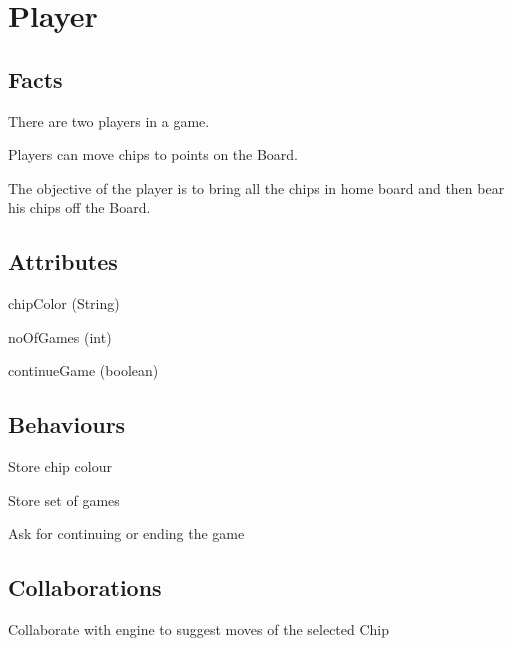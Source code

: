 \section{Player}

\subsection{Facts}

\begin{dashed}
    \item There are two players in a game.
    \item Players can move chips to points on the Board.
    \item The objective of the player is to bring all the chips in home board and then bear his chips off the Board.
\end{dashed}

\subsection{Attributes}

\begin{dashed}
    \item chipColor (String)
    \item noOfGames (int)
    \item continueGame (boolean)
\end{dashed}

\subsection{Behaviours}

\begin{dashed}
    \item Store chip colour
    \item Store set of games
    \item Ask for continuing or ending the game
\end{dashed}

\subsection{Collaborations}

\begin{dashed}
    \item Collaborate with engine to suggest moves of the selected Chip
\end{dashed}

